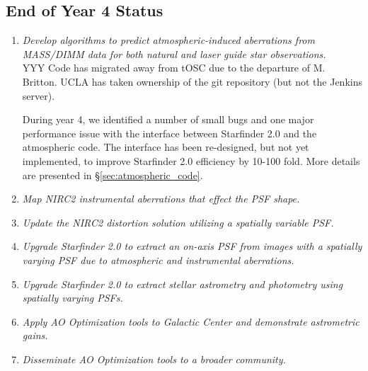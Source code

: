 \subsection{End of Year 4 Status}
\begin{enumerate}
\item {\em Develop algorithms to predict atmospheric-induced aberrations
  from MASS/DIMM data for both natural and laser guide star
  observations.} \\
  YYY Code has migrated away from tOSC due to the departure of
  M. Britton. UCLA has taken ownership of the git repository (but not
  the Jenkins server). 

  During year 4, we identified a number of small bugs and one major
  performance issue with the interface between Starfinder 2.0 and the
  atmospheric code. The interface has been re-designed, but not yet
  implemented, to improve Starfinder 2.0 efficiency by 10-100
  fold. More details are presented in \S\ref{sec:atmospheric_code}.

\item {\em Map NIRC2 instrumental aberrations that effect the PSF
    shape.} \\
  
  
\item {\em Update the NIRC2 distortion solution utilizing a spatially
  variable PSF.} \\


\item {\em Upgrade Starfinder 2.0 to extract an on-axis PSF from images with
  a spatially varying PSF due to atmospheric and instrumental
  aberrations.} \\


\item {\em Upgrade Starfinder 2.0 to extract stellar astrometry and
  photometry using spatially varying PSFs.} \\


\item {\em Apply AO Optimization tools to Galactic Center and demonstrate
  astrometric gains.} \\

\item {\em Disseminate AO Optimization tools to a broader community.} \\
\end{enumerate}

  
  